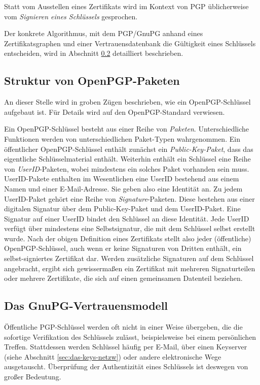 Statt vom Ausstellen eines Zertifikats wird im Kontext von PGP
üblicherweise vom \emph{Signieren eines Schlüssels} gesprochen.

Der konkrete Algorithmus, mit dem PGP/GnuPG anhand eines
Zertifikatsgraphen und einer Vertrauensdatenbank die Gültigkeit
eines Schlüssels entscheiden, wird in Abschnitt
\ref{sec:das-gnupg-vertrauensmodell} detailliert beschrieben.

\subsection{Struktur von OpenPGP-Paketen}
\label{sec:structure-openpgp}
An dieser Stelle wird in groben Zügen beschrieben, wie ein
OpenPGP-Schlüssel aufgebaut ist. Für Details wird auf den
OpenPGP-Standard\cite{Callas2007} verwiesen.

Ein OpenPGP-Schlüssel besteht aus einer Reihe von
\emph{Paketen}. Unterschiedliche Funktionen werden von
unterschiedlichen Paket-Typen wahrgenommen. Ein öffentlicher
OpenPGP-Schlüssel enthält zunächst ein \emph{Public-Key-Paket},
dass das eigentliche Schlüsselmaterial enthält. Weiterhin
enthält ein Schlüssel eine Reihe von \emph{UserID}-Paketen, wobei
mindestens ein solches Paket vorhanden sein muss. UserID-Pakete
enthalten im Wesentlichen eine UserID bestehend aus einem Namen und
einer E-Mail-Adresse. Sie geben also eine Identität an. Zu jedem
UserID-Paket gehört eine Reihe von \emph{Signature}-Paketen. Diese
bestehen aus einer digitalen Signatur über dem Public-Key-Paket und
dem UserID-Paket. Eine Signatur auf einer UserID bindet den
Schlüssel an diese Identität. Jede UserID verfügt über
mindestens eine Selbstsignatur, die mit dem Schlüssel selbst
erstellt wurde. Nach der obigen Definition eines Zertifikats stellt
also jeder (öffentliche) OpenPGP-Schlüssel, auch wenn er keine
Signaturen von Dritten enthält, ein selbst-signiertes Zertifikat
dar. Werden zusätzliche Signaturen auf dem Schlüssel angebracht,
ergibt sich gewissermaßen ein Zertifikat mit mehreren Signaturteilen
oder mehrere Zertifikate, die sich auf einen gemeinsamen Datenteil
beziehen.

\subsection{Das GnuPG-Vertrauensmodell}
\label{sec:das-gnupg-vertrauensmodell}

Öffentliche PGP-Schlüssel werden oft nicht in einer Weise übergeben,
die die sofortige Verifikation des Schlüssels zulässt, beispielsweise
bei einem persönlichen Treffen. Stattdessen werden Schlüssel häufig
per E-Mail, über einen Keyserver (siehe Abschnitt
\ref{sec:das-keys-netzw}) oder andere elektronische Wege ausgetauscht.
Überprüfung der Authentizität eines Schlüssels ist deswegen von
großer Bedeutung.

